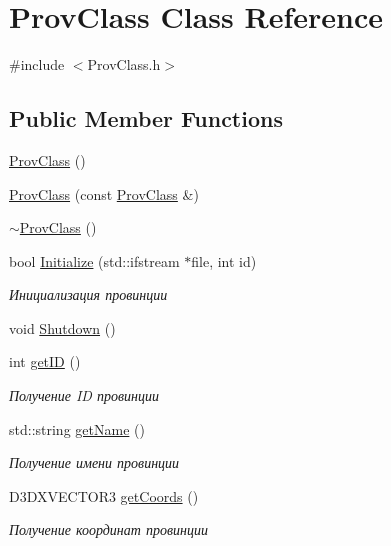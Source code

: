 \hypertarget{class_prov_class}{}\section{Prov\+Class Class Reference}
\label{class_prov_class}


{\ttfamily \#include $<$Prov\+Class.\+h$>$}

\subsection*{Public Member Functions}
\begin{DoxyCompactItemize}
\item 
\hyperlink{class_prov_class_ab977253f809da49728f2e46c4afe5e91}{Prov\+Class} ()
\item 
\hyperlink{class_prov_class_a4d4b6fb1dce8565e3760df40f92cab5a}{Prov\+Class} (const \hyperlink{class_prov_class}{Prov\+Class} \&)
\item 
\hyperlink{class_prov_class_ae0d2a847764e700a0af245feff912c87}{$\sim$\+Prov\+Class} ()
\item 
bool \hyperlink{class_prov_class_add3350b63d3fcbffee08f253d0fef98a}{Initialize} (std\+::ifstream $\ast$file, int id)
\begin{DoxyCompactList}\small\item\em Инициализация провинции \end{DoxyCompactList}\item 
void \hyperlink{class_prov_class_aab053eb395e45580e5c65fd74e264361}{Shutdown} ()
\item 
int \hyperlink{class_prov_class_a8cb7ae2b2f6bf292b789060fa719436d}{get\+ID} ()
\begin{DoxyCompactList}\small\item\em Получение ID провинции \end{DoxyCompactList}\item 
std\+::string \hyperlink{class_prov_class_accc6f1505990cae5065fdcf0669e1f59}{get\+Name} ()
\begin{DoxyCompactList}\small\item\em Получение имени провинции \end{DoxyCompactList}\item 
D3\+D\+X\+V\+E\+C\+T\+O\+R3 \hyperlink{class_prov_class_a13be7aabc6416d8390a5e08a3852dbd4}{get\+Coords} ()
\begin{DoxyCompactList}\small\item\em Получение координат провинции \end{DoxyCompactList}\item 

\end{DoxyCompactItemize}
